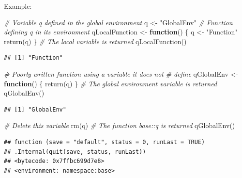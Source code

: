 \documentclass[
  12pt,
  american,
  a4paper,
  extrafontsizes,onecolumn,openright
  ]{memoir}
\newenvironment{Shaded}{\begin{snugshade}}{\end{snugshade}}
\newcommand{\CommentTok}[1]{\textcolor[rgb]{0.56,0.35,0.01}{\textit{#1}}}
\newcommand{\ControlFlowTok}[1]{\textcolor[rgb]{0.13,0.29,0.53}{\textbf{#1}}}
\newcommand{\FunctionTok}[1]{\textcolor[rgb]{0.00,0.00,0.00}{#1}}
\newcommand{\NormalTok}[1]{#1}
\newcommand{\OtherTok}[1]{\textcolor[rgb]{0.56,0.35,0.01}{#1}}
\newcommand{\StringTok}[1]{\textcolor[rgb]{0.31,0.60,0.02}{#1}}
\begin{document}
Example:

\scriptsize

\begin{Shaded}
\begin{Highlighting}[]
\CommentTok{\# Variable q defined in the global environment}
\NormalTok{q }\OtherTok{\textless{}{-}} \StringTok{"GlobalEnv"}
\CommentTok{\# Function defining q in its environment}
\NormalTok{qLocalFunction }\OtherTok{\textless{}{-}} \ControlFlowTok{function}\NormalTok{() \{}
\NormalTok{    q }\OtherTok{\textless{}{-}} \StringTok{"Function"}
    \FunctionTok{return}\NormalTok{(q)}
\NormalTok{\}}
\CommentTok{\# The local variable is returned}
\FunctionTok{qLocalFunction}\NormalTok{()}
\end{Highlighting}
\end{Shaded}

\begin{verbatim}
## [1] "Function"
\end{verbatim}

\begin{Shaded}
\begin{Highlighting}[]
\CommentTok{\# Poorly written function using a variable it does not}
\CommentTok{\# define}
\NormalTok{qGlobalEnv }\OtherTok{\textless{}{-}} \ControlFlowTok{function}\NormalTok{() \{}
    \FunctionTok{return}\NormalTok{(q)}
\NormalTok{\}}
\CommentTok{\# The global environment variable is returned}
\FunctionTok{qGlobalEnv}\NormalTok{()}
\end{Highlighting}
\end{Shaded}

\begin{verbatim}
## [1] "GlobalEnv"
\end{verbatim}

\begin{Shaded}
\begin{Highlighting}[]
\CommentTok{\# Delete this variable}
\FunctionTok{rm}\NormalTok{(q)}
\CommentTok{\# The function base::q is returned}
\FunctionTok{qGlobalEnv}\NormalTok{()}
\end{Highlighting}
\end{Shaded}

\begin{verbatim}
## function (save = "default", status = 0, runLast = TRUE) 
## .Internal(quit(save, status, runLast))
## <bytecode: 0x7ffbc699d7e8>
## <environment: namespace:base>
\end{verbatim}

\normalsize
\end{document}
